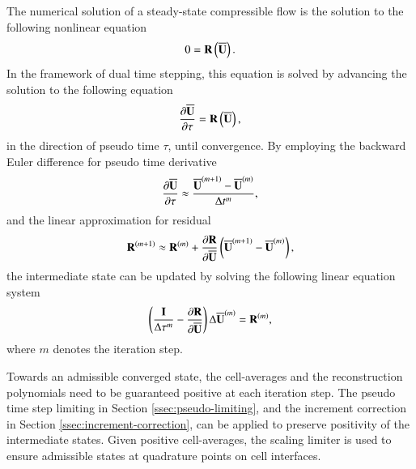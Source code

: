 The numerical solution of a steady-state compressible flow is the solution to the following nonlinear equation
\begin{equation}
    0 = \mathbf{R} \left(\overline{\mathbf{U}}\right).
\end{equation}
In the framework of dual time stepping, this equation is solved by advancing the solution to the following equation
\begin{equation}
    \dfrac{\partial \overline{\mathbf{U}}}{\partial \tau} = \mathbf{R} \left(\overline{\mathbf{U}}\right),
\end{equation}
in the direction of pseudo time $\tau$, until convergence. By employing the backward Euler difference for pseudo time derivative
\begin{equation}
    \dfrac{\partial \overline{\mathbf{U}}}{\partial \tau} \approx \dfrac{\overline{\mathbf{U}}^{(m+1)}-\overline{\mathbf{U}}^{(m)}}{\mathrm\Delta t^m},
\end{equation}
and the linear approximation for residual
\begin{equation}
    \mathbf{R}^{(m+1)} \approx \mathbf{R}^{(m)} + \dfrac{\partial \mathbf{R}}{\partial \overline{\mathbf{U}}} \left(\overline{\mathbf{U}}^{(m+1)}-\overline{\mathbf{U}}^{(m)}\right),
\end{equation}
the intermediate state can be updated by solving the following linear equation system
\begin{equation}
    \left(\frac{\eye}{\inc \tau^m} -\partialderivative{\R }{\uu} \right) \inc \uu^{\left(m\right)}
    = \R^{\left(m\right)},
\end{equation}
where $m$ denotes the iteration step. 

Towards an admissible converged state, the cell-averages and the reconstruction polynomials need to be guaranteed positive at each iteration step. The pseudo time step limiting in Section \ref{ssec:pseudo-limiting}, and the increment correction in Section \ref{ssec:increment-correction}, can be applied to preserve positivity of the intermediate states. Given positive cell-averages, the scaling limiter is used to ensure admissible states at quadrature points on cell interfaces. 




\endgroup
